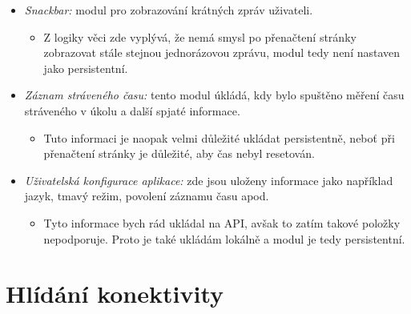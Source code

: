 \begin{itemize}
\begin{itemize}
        \end{itemize}
    \item \emph{Snackbar:} modul pro zobrazování krátných zpráv uživateli.
        \begin{itemize}
            \item Z logiky věci zde vyplývá, že nemá smysl po přenačtení stránky zobrazovat stále stejnou jednorázovou zprávu, modul tedy není nastaven jako persistentní.
        \end{itemize}
    \item \emph{Záznam stráveného času:} tento modul úkládá, kdy bylo spuštěno měření času stráveného v úkolu a další spjaté informace.
        \begin{itemize}
            \item Tuto informaci je naopak velmi důležité ukládat persistentně, neboť při přenačtení stránky je důležité, aby čas nebyl resetován.
        \end{itemize}
    \item \emph{Uživatelská konfigurace aplikace:} zde jsou uloženy informace jako například jazyk, tmavý režim, povolení záznamu času apod.
        \begin{itemize}
            \item Tyto informace bych rád ukládal na API, avšak to zatím takové položky nepodporuje. Proto je také ukládám lokálně a modul je tedy persistentní.
        \end{itemize}
\end{itemize}


\section{Hlídání konektivity}

